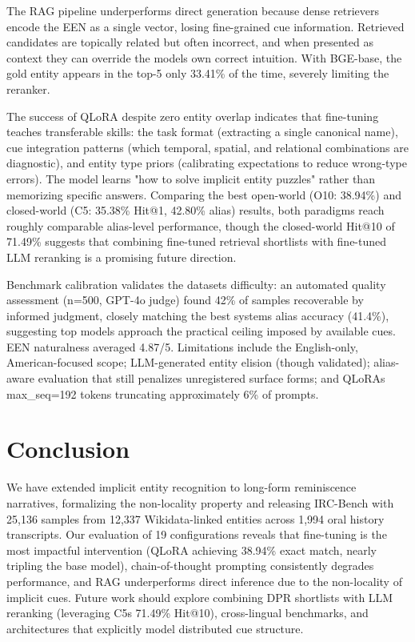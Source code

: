﻿\documentclass{article}
\begin{document}
The RAG pipeline underperforms direct generation because dense
retrievers encode the EEN as a single vector, losing fine-grained cue
information. Retrieved candidates are topically related but often
incorrect, and when presented as context they can override the
model\textquotesingle s own correct intuition. With BGE-base, the gold
entity appears in the top-5 only 33.41\% of the time, severely limiting
the reranker.

The success of QLoRA despite zero entity overlap indicates that
fine-tuning teaches transferable skills: the task format (extracting a
single canonical name), cue integration patterns (which temporal,
spatial, and relational combinations are diagnostic), and entity type
priors (calibrating expectations to reduce wrong-type errors). The model
learns "how to solve implicit entity puzzles" rather than memorizing
specific answers. Comparing the best open-world (O10: 38.94\%) and
closed-world (C5: 35.38\% Hit@1, 42.80\% alias) results, both paradigms
reach roughly comparable alias-level performance, though the
closed-world Hit@10 of 71.49\% suggests that combining fine-tuned
retrieval shortlists with fine-tuned LLM reranking is a promising future
direction.

Benchmark calibration validates the dataset\textquotesingle s
difficulty: an automated quality assessment (n=500, GPT-4o judge) found
42\% of samples recoverable by informed judgment, closely matching the
best system\textquotesingle s alias accuracy (41.4\%), suggesting top
models approach the practical ceiling imposed by available cues. EEN
naturalness averaged 4.87/5. Limitations include the English-only,
American-focused scope; LLM-generated entity elision (though validated);
alias-aware evaluation that still penalizes unregistered surface forms;
and QLoRA\textquotesingle s max\_seq=192 tokens truncating approximately
6\% of prompts.

\section{Conclusion}\label{conclusion}

We have extended implicit entity recognition to long-form reminiscence
narratives, formalizing the non-locality property and releasing
IRC-Bench with 25,136 samples from 12,337 Wikidata-linked entities
across 1,994 oral history transcripts. Our evaluation of 19
configurations reveals that fine-tuning is the most impactful
intervention (QLoRA achieving 38.94\% exact match, nearly tripling the
base model), chain-of-thought prompting consistently degrades
performance, and RAG underperforms direct inference due to the
non-locality of implicit cues. Future work should explore combining DPR
shortlists with LLM reranking (leveraging C5\textquotesingle s 71.49\%
Hit@10), cross-lingual benchmarks, and architectures that explicitly
model distributed cue structure.
\end{document}
